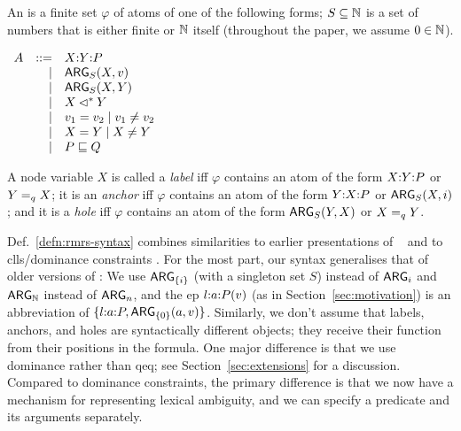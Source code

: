 \begin{definition}\label{defn:rmrs-syntax}
  An \emph{\rmrs} is a finite set $\varphi$ of atoms of one of the
  following forms; $S \subseteq \mathbb{N}$ is a set of numbers that is either
  finite or $\mathbb{N}$ itself (throughout the paper, we assume 
    $0 \in \mathbb{N}$).

$\begin{array}{rrll}
A &::= &\ep{X}{Y}{P} \\ %
&| &\ARG_S(X,v) \\ %
&| &\ARG_S(X,Y) \\ %
&| &X \dom Y \\ %
&| &v_1 = v_2 \;|\; v_1 \neq v_2 \\ %
&| &X = Y \;|\; X \neq Y \\ %
&| &P \spec Q %
\end{array}
$

A node variable $X$ is called a \emph{label} iff $\varphi$ contains an
atom of the form $X {:} Y {:} P$ or $Y =_q X$; it is an 
\emph{anchor} iff $\varphi$ contains an atom
of the form $Y {:} X {:} P$ or $\mathsf{ARG}_S(X,i)$; and it is a
\emph{hole} iff $\varphi$ contains an atom of the form $\mathsf{ARG}_S(Y,X)$
or $X =_q Y$.
\end{definition}

Def.~\ref{defn:rmrs-syntax} combines similarities to earlier
presentations of \rmrs\ \cite{copestake:2003,copestake:2007b} and to
{\sc clls}/dominance constraints \cite{egg:etal:2001}.  For the most
part, our syntax generalises that of older versions of \rmrs: We use
$\mathsf{ARG}_{\{i\}}$ (with a singleton set $S$) instead of $\mathsf{ARG}_i$ and
$\mathsf{ARG}_{\mathbb{N}}$ instead of $\mathsf{ARG}_n$, and the {\sc ep} $l {:} a {:} P(v)$ (as
in Section~\ref{sec:motivation}) is an abbreviation of
$\{l {:} a {:} P, \mathsf{ARG}_{\{0\}}(a,v)\}$.  Similarly, we don't assume
that labels, anchors, and holes are syntactically different objects;
they receive their function from their positions in the formula.  One
major difference is that we use dominance rather than qeq; see
Section~\ref{sec:extensions} for a discussion.  Compared to dominance
constraints, the primary difference is that we now have a mechanism
for representing lexical ambiguity, and we can specify a predicate and
its arguments separately.


